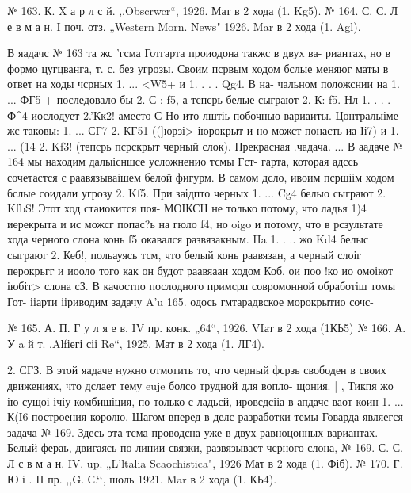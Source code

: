 № 163. К. X а р л с й. ,,Obscrwcr“, 1926.
Мат в 2 хода (1. Kg5).
	№ 164. С. С. Л е в м а н.
I поч. отз. „Western Morn. News" 1926.
Mar в 2 хода (1. Agl).


В яадачс № 163 та жс 'гсма Готгарта проиодона такжс в двух ва- риантах, но в формо цугцванга, т. с. без угрозы. Своим псрвым ходом бслые меняюг маты в ответ на ходы чсрных 1. ... <W5+ и 1. . . . Qg4. В на- чальном положснии на 1. ... ФГ5 + последовало бы 2. С : f5, а тспсрь белые сыграют 2. К: f5. Нл 1. . . . Ф^4 иослодует 2.’Кк2! аместо С Но ито лштіь побочныо вариаиты. Цонтралыіме жс таковы: 1. ... СГ7
2. КГ51 ((]юрзі> іюрокрыт и но можст понасть иа Іі7) и 1. ... (14 2. Kf3! (тепсрь псрскрыт черный слок). Прекрасная .чадача. ...
      В аадаче № 164 мы находим далыісншсе усложненио тсмы Гст- гарта, которая адссь сочетастся с раавязываішем белой фигурм. В самом дсло, ивоим псршіім ходом бслые соидали угрозу 2. Kf5. При заідпто черных 1. ... Cg4 белыо сыграют 2. KfbS! Этот ход стаиокится поя- МОІКСН не только потому, что ладья 1)4 иерекрыта и ис можсг попас?ь
на гюло f4, но oigo и потому, что в рсзультате хода черного слона конь f5 окавался развязакным. Ha 1. . .. жо Kd4 белыс сыграюг 2. Кеб!, польауясь тсм, что белый конь раавязан, а черный слоіг перокрьгг и иооло того как он будот раавяаан ходом Коб, ои поо !ко ио омоікот іюбіт> слона сЗ.
В качостпо послодного примсрп совромонной обработіш томы Гот- ііарти ііриводим задачу A'u 165. одось гмтарадвское морокрытио сочс-

№ 165. А. П. Г у л я е в.
IV пр. конк. „64“, 1926.
VIат в 2 хода (1КЬ5)	№ 166. А. У a й т.
,Alfіегі сіі Re“, 1925.
Мат в 2 хода (1. ЛГ4).


2. СГЗ. В этой яадаче нужно отмотить то, что черный фсрзь свободен в своих движениях, что дслает тему euje болсо трудной для вопло- щония. |	,
Тикпя жо ію сущоі-ічіу комбишіция, по только с ладьсй, ировсдсііа
в апдачс ваот коин
1. ... К(І6 построения королю.
    Шагом вперед в делс разработки темы Говарда являегся задача № 169. Здесь эта тсма проводсна уже в двух равноцонных вариантах. Белый фераь, двигаясь по линии связки, развязывает чсрного слона,
№ 169. С. С. Л с в м а н.
IV. up. „L’ltalia Scaochistica", 1926
Мат в 2 хода (1. Фіб).
	№ 170. Г. Ю і
. II пр. ,,G. С.‘‘, шоль 1921.
Mar в 2 хода (1. КЬ4).



